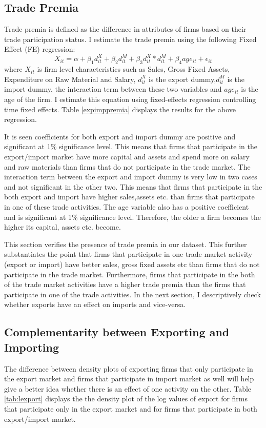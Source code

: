 \documentclass[11pt]{article}
\begin{document}
\subsection{Trade Premia}
Trade premia is defined as the difference in
attributes of firms based on their trade participation status. I
estimate the trade premia using the following Fixed Effect (FE) regression:
$$ X_{it} = \alpha + \beta_{1} d_{it}^{X}+ \beta_{2} d_{it}^{M}+
\beta_{3} d_{it}^{X}*d_{it}^{M} + \beta_{4} age_{it} + \epsilon_{it}$$
where $X_{it}$ is firm level characteristics such as Sales, Gross
Fixed Assets, Expenditure on Raw Material and Salary, $d_{it}^X$ is
the export dummy,$d_{it}^M$ is
the import  dummy, the interaction term between these two variables
and $age_{it}$ is the age of the firm. I estimate this equation using
fixed-effects regression controlling time fixed
effects. Table \ref{expimppremia} displays the results for the above
regression. 
\begin{center}

\end{center}
It is seen coefficients for both export and import dummy are positive
and significant at 1\% significance level. This means that firms that
participate in the export/import market have more capital and assets
and spend more on salary and raw materials than firms that do not
participate in the trade market. The interaction term between the
export and import dummy is very low in two cases and not significant
in the other two. This means that firms that participate in the both
export and import have  higher sales,assets etc. than firms that
participate in one of these trade activities. The age variable also
has a positive coefficient and is significant at 1\% significance
level. Therefore, the older a firm becomes the higher its capital,
assets etc. become. 

This section verifies the presence of trade premia in our
dataset. This further substantiates the point that firms that
participate in one trade market activity (export or import) have
better sales, gross fixed assets etc than firms that do not
participate in the trade market. Furthermore, firms that participate
in the both of the trade market activities have a higher trade premia
than the firms that participate in one of the trade activities. 
 In the next section, I descriptively check whether exports have an effect
on imports and vice-versa.  

\subsection{Complementarity between Exporting and Importing}
The difference between density plots of exporting firms that only participate in the
export market and firms that participate in import market as well will help
give a better  idea whether there is an effect of one activity on the other. 
Table \ref{tab:lexport} displays the the density plot  of the log
values of export  for firms that participate only in the
export market and for firms that participate in both export/import
market. 
\end{document}
